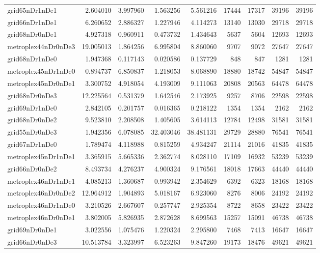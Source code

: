 \begin{longtable}{|l|r|r|r|r|r|r|r|r|}
grid65nDr1nDe1 & 2.604010 & 3.997960 & 1.563256 & 5.561216 & 17444 & 17317 & 39196 & 39196 \\
grid66nDr1nDe1 & 6.260652 & 2.886327 & 1.227946 & 4.114273 & 13140 & 13030 & 29718 & 29718 \\
grid68nDr0nDe1 & 4.927318 & 0.960911 & 0.473732 & 1.434643 & 5637 & 5604 & 12693 & 12693 \\
metroplex44nDr0nDe3 & 19.005013 & 1.864256 & 6.995804 & 8.860060 & 9707 & 9072 & 27647 & 27647 \\
grid68nDr1nDe0 & 1.947368 & 0.117143 & 0.020586 & 0.137729 & 848 & 847 & 1281 & 1281 \\
metroplex45nDr1nDe0 & 0.894737 & 6.850837 & 1.218053 & 8.068890 & 18880 & 18742 & 54847 & 54847 \\
metroplex45nDr0nDe1 & 3.300752 & 4.918054 & 4.193009 & 9.111063 & 20808 & 20563 & 64478 & 64478 \\
grid68nDr0nDe3 & 12.225564 & 0.531379 & 1.642546 & 2.173925 & 9257 & 8706 & 22598 & 22598 \\
grid69nDr1nDe0 & 2.842105 & 0.201757 & 0.016365 & 0.218122 & 1354 & 1354 & 2162 & 2162 \\
grid68nDr0nDe2 & 9.523810 & 2.208508 & 1.405605 & 3.614113 & 12784 & 12498 & 31581 & 31581 \\
grid55nDr0nDe3 & 1.942356 & 6.078085 & 32.403046 & 38.481131 & 29729 & 28880 & 76541 & 76541 \\
grid67nDr1nDe0 & 1.789474 & 4.118988 & 0.815259 & 4.934247 & 21114 & 21016 & 41835 & 41835 \\
metroplex45nDr1nDe1 & 3.365915 & 5.665336 & 2.362774 & 8.028110 & 17109 & 16932 & 53239 & 53239 \\
grid66nDr0nDe2 & 8.493734 & 4.276237 & 4.900324 & 9.176561 & 18018 & 17663 & 44440 & 44440 \\
metroplex46nDr1nDe1 & 4.085213 & 1.360687 & 0.993942 & 2.354629 & 6392 & 6323 & 18168 & 18168 \\
metroplex46nDr0nDe2 & 12.964912 & 1.904893 & 5.018167 & 6.923060 & 8276 & 8006 & 24192 & 24192 \\
metroplex46nDr1nDe0 & 3.210526 & 2.667607 & 0.257747 & 2.925354 & 8722 & 8658 & 23422 & 23422 \\
metroplex46nDr0nDe1 & 3.802005 & 5.826935 & 2.872628 & 8.699563 & 15257 & 15091 & 46738 & 46738 \\
grid69nDr0nDe1 & 3.022556 & 1.075476 & 1.220324 & 2.295800 & 7468 & 7413 & 16647 & 16647 \\
grid66nDr0nDe3 & 10.513784 & 3.323997 & 6.523263 & 9.847260 & 19173 & 18476 & 49621 & 49621 \\

\end{longtable}
